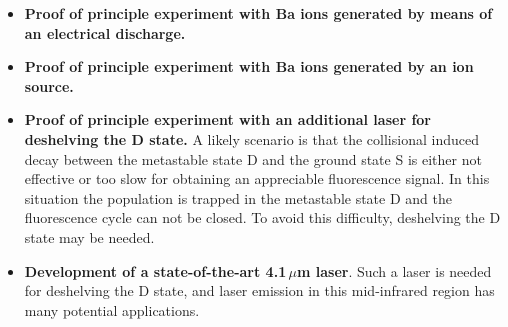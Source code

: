 \begin{itemize}
	\item \textbf{Proof of principle experiment with Ba ions generated by means of an electrical discharge.}
	
	\item \textbf{Proof of principle experiment with Ba ions generated by an ion source.}	
	
%	
	\item \textbf{Proof of principle experiment with an additional laser for deshelving the D state.} A likely scenario is that the collisional induced decay between the metastable state D and the ground state S is either not effective or too slow for obtaining an appreciable fluorescence signal. In this situation the population is trapped in the metastable state D and the fluorescence cycle can not be closed. To avoid this difficulty, deshelving the D state may be needed.

\item \textbf{Development of a state-of-the-art 4.1\,$\mu$m laser}. Such a laser is needed for deshelving the D state, and laser emission in this mid-infrared region has many potential applications.

\end{itemize}

